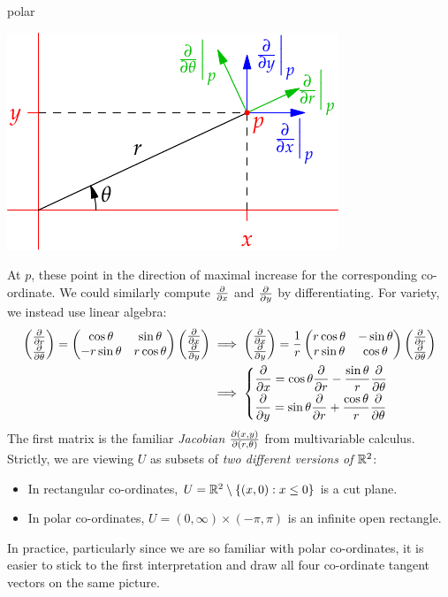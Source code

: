 \begin{examples}{}{polar}
\begin{enumerate}
	\hfill
	\begin{minipage}[t]{0.39\linewidth}\vspace{0pt}
		\flushright\includegraphics{forms-polar}
	\end{minipage}
	\bigbreak
	At $p$, these point in the direction of maximal increase for the corresponding co-ordinate.\smallbreak
	We could similarly compute $\partials x$ and $\partials y$ by differentiating. For variety, we instead use linear algebra:
	\begin{align*}
		\twovec{\partials r}{\partials\theta}
		=
		\begin{pmatrix}
			\cos\theta&\sin\theta\\
			-r\sin\theta&r\cos\theta
		\end{pmatrix}
		\twovec{\partials x}{\partials y}
		&\implies
		\twovec{\partials x}{\partials y}
		=
		\frac 1r
		\begin{pmatrix}
			r\cos\theta&-\sin\theta\\
			r\sin\theta&\cos\theta
		\end{pmatrix}
		\twovec{\partials r}{\partials\theta}\\
		&\implies
		\begin{cases}
			\displaystyle \partials x=\cos\theta\partials r-\frac{\sin\theta}r\partials\theta\\[5pt]
			\displaystyle \partials y=\sin\theta\partials r+\frac{\cos\theta}r\partials\theta
		\end{cases}
	\end{align*}
	The first matrix is the familiar \emph{Jacobian} $\partials[(x,y)]{(r,\theta)}$ from multivariable calculus.
	Strictly, we are viewing $U$ as subsets of \emph{two different versions of $\R^2$}:
	\begin{itemize}
	  \item In rectangular co-ordinates, $U=\R^2\setminus\{(x,0):x\le 0\}$ is a cut plane.
	  \item In polar co-ordinates, $U=(0,\infty)\times(-\pi,\pi)$ is an infinite open rectangle.
	\end{itemize}
	In practice, particularly since we are so familiar with polar co-ordinates, it is easier to stick to the first interpretation and draw all four co-ordinate tangent vectors on the same picture.
\end{enumerate}
\end{examples}





